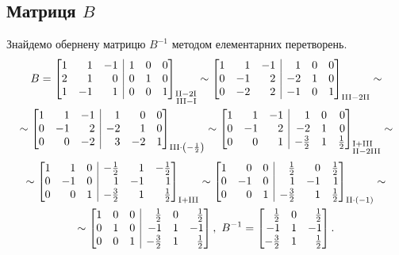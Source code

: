 \subsection[Матриця B]{Матриця \(B\)}
\solving
Знайдемо обернену матрицю \(B^{-1}\) методом елементарних перетворень.
\begin{gather}
	B=\left[\begin{array}{@{}rrr|rrr@{}}
		1&1&-1&1&0&0\\
		2&1&0&0&1&0\\
		1&-1&1&0&0&1
	\end{array}\right]_{\substack{\mathrm{II-2I}\\\hfill\mathrm{III-I}}}\sim\left[\begin{array}{@{}rrr|rrr@{}}
	1&1&-1&1&0&0\\
	0&-1&2&-2&1&0\\
	0&-2&2&-1&0&1
\end{array}\right]_{\mathrm{III-2II}}\sim\\
\sim\left[\begin{array}{@{}rrr|rrr@{}}
	1&1&-1&1&0&0\\
	0&-1&2&-2&1&0\\
	0&0&-2&3&-2&1
\end{array}\right]_{\mathrm{III\cdot\left(-\frac{1}{2}\right)}}\sim\left[\begin{array}{@{}rrr|rrr@{}}
1&1&-1&1&0&0\\
0&-1&2&-2&1&0\\
0&0&1&-\frac{3}{2}&1&\frac{1}{2}
\end{array}\right]_{\substack{\mathrm{I+III}\hfill\\\mathrm{II-2III}}}\sim
\end{gather}
\begin{gather}
\sim\left[\begin{array}{@{}rrr|rrr@{}}
	1&1&0&-\frac{1}{2}&1&-\frac{1}{2}\\
	0&-1&0&1&-1&1\\
	0&0&1&-\frac{3}{2}&1&\frac{1}{2}
\end{array}\right]_{\mathrm{I+III}}\sim\left[\begin{array}{@{}rrr|rrr@{}}
1&0&0&\frac{1}{2}&0&\frac{1}{2}\\
0&-1&0&1&-1&1\\
0&0&1&-\frac{3}{2}&1&\frac{1}{2}
\end{array}\right]_{\mathrm{II\cdot(-1)}}\sim\\
\sim\left[\begin{array}{@{}rrr|rrr@{}}
	1&0&0&\frac{1}{2}&0&\frac{1}{2}\\
	0&1&0&-1&1&-1\\
	0&0&1&-\frac{3}{2}&1&\frac{1}{2}
\end{array}\right],\ B^{-1}=\begin{bmatrix*}[r]
\frac{1}{2}&0&\frac{1}{2}\\
-1&1&-1\\
-\frac{3}{2}&1&\frac{1}{2}
\end{bmatrix*}.
\end{gather}
